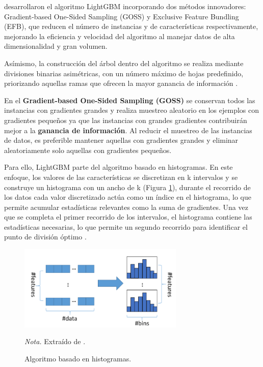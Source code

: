 \citet{ke_lightgbm_2017} desarrollaron el algoritmo LightGBM incorporando dos métodos innovadores: Gradient-based One-Sided Sampling (GOSS) y Exclusive Feature Bundling (EFB), que reducen el número de instancias y de características respectivamente, 
mejorando la eficiencia y velocidad del algoritmo al manejar datos de alta dimensionalidad y gran volumen. 

Asímismo, la construcción del árbol dentro del algoritmo se realiza mediante divisiones binarias asimétricas, con un número máximo de hojas predefinido, priorizando 
aquellas ramas que ofrecen la mayor ganancia de información \citep{ke_lightgbm_2017}.

En el \textbf{Gradient-based One-Sided Sampling (GOSS)} se conservan todos las instancias con gradientes grandes y realiza muestreo aleatorio en los ejemplos con gradientes pequeños ya que las instancias con grandes gradientes 
contribuirán mejor a la \textbf{ganancia de información}. Al reducir el muestreo de las instancias de datos, es preferible mantener aquellas con gradientes grandes y eliminar aleatoriamente solo aquellas 
con gradientes pequeños.

Para ello, LightGBM parte del algoritmo basado en histogramas. En este enfoque, los valores de las características se discretizan en k intervalos y se construye un histograma con un ancho de k (Figura \ref{fig:histogram}), durante el recorrido de los datos cada valor discretizado actúa 
como un índice en el histograma, lo que permite acumular estadísticas relevantes como la suma de gradientes. Una vez que se completa el primer recorrido de los intervalos, el histograma contiene las estadísticas necesarias, lo que permite un segundo recorrido para 
identificar el punto de división óptimo \citep{luo_two_2020}.

\begin{figure}[H]
    \centering
    \caption{Algoritmo basado en histogramas.}
    \includegraphics[width=0.7\textwidth]{img/4_marco_teorico/spliting.png}
    \label{fig:histogram}
    \begin{flushleft}
        \textit{Nota.} Extraído de \citet{luo_two_2020}. 
        \vspace{-\baselineskip}
    \end{flushleft}
\end{figure}

